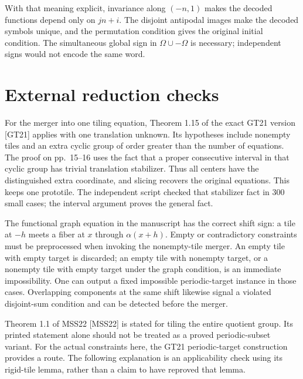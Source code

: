 \documentclass[10pt]{article}
\begin{document}
With that meaning explicit, invariance along \((-n,1)\) makes the decoded functions depend only on \(jn+i\). The disjoint antipodal images make the decoded symbols unique, and the permutation condition gives the original initial condition. The simultaneous global sign in \(\Omega\cup-\Omega\) is necessary; independent signs would not encode the same word.\par
\section*{External reduction checks}
For the merger into one tiling equation, Theorem 1.15 of the exact GT21 version [GT21] applies with one translation unknown. Its hypotheses include nonempty tiles and an extra cyclic group of order greater than the number of equations. The proof on pp. 15–16 uses the fact that a proper consecutive interval in that cyclic group has trivial translation stabilizer. Thus all centers have the distinguished extra coordinate, and slicing recovers the original equations. This keeps one prototile. The independent script checked that stabilizer fact in 300 small cases; the interval argument proves the general fact.\par
The functional graph equation in the manuscript has the correct shift sign: a tile at \(-h\) meets a fiber at \(x\) through \(\alpha(x+h)\). Empty or contradictory constraints must be preprocessed when invoking the nonempty-tile merger. An empty tile with empty target is discarded; an empty tile with nonempty target, or a nonempty tile with empty target under the graph condition, is an immediate impossibility. One can output a fixed impossible periodic-target instance in those cases. Overlapping components at the same shift likewise signal a violated disjoint-sum condition and can be detected before the merger.\par
Theorem 1.1 of MSS22 [MSS22] is stated for tiling the entire quotient group. Its printed statement alone should not be treated as a proved periodic-subset variant. For the actual constraints here, the GT21 periodic-target construction provides a route. The following explanation is an applicability check using its rigid-tile lemma, rather than a claim to have reproved that lemma.\par
\end{document}
